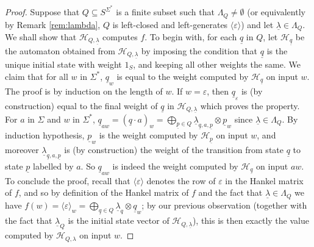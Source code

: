 \documentclass[10pt,a4paper]{amsart}
\theoremstyle{definition}
\numberwithin{equation}{section}
\numberwithin{theorem}{section}
\begin{document}
\begin{proof}
Suppose that $Q \subseteq S^{\Sigma^*}$ is a finite subset such that $\Lambda_Q \neq \emptyset$ (or equivalently by Remark \ref{rem:lambda}, $Q$ is left-closed and left-generates $\langle \varepsilon \rangle$) and let $\underline{\lambda} \in \Lambda_{Q}$. We shall show that $\mathcal{H}_{Q, \underline{\lambda}}$ computes $f$. To begin with, for each $\underline{q}$ in $Q$, let $\mathcal{H}_{\underline{q}}$ be the automaton obtained from $\mathcal{H}_{Q,\underline{\lambda}}$ by imposing the condition that $\underline{q}$ is the unique initial state with weight $1_S$, and keeping all other weights the same. We claim that for all
$w$ in $\Sigma^*$, $\underline{q}_w$ is equal to the weight computed by $\mathcal{H}_{\underline{q}}$ on input $w$. The proof is by induction on the length of $w$. If $w=\varepsilon$, then $\underline{q}_\varepsilon$ is (by construction) equal to the final weight of $\underline{q}$ in $\mathcal{H}_{Q,\underline{\lambda}}$ which proves the property. For $a$ in $\Sigma$ and $w$ in $\Sigma^*$, $\underline{q}_{aw} = (\underline{q}\cdot a)_w = \bigoplus_{\underline{p} \in Q}  \underline{\lambda}_{\underline{q},a,\underline{p}} \otimes \underline{p}_w$ since $\underline{\lambda} \in \Lambda_Q$. By induction hypothesis, $\underline{p}_w$ is the weight computed by $\mathcal{H}_{\underline{p}}$ on input $w$, and moreover $\underline{\lambda}_{\underline{q},a,\underline{p}}$ is (by construction)  the weight of the transition from state $\underline{q}$ to state $\underline{p}$ labelled by $a$. So $\underline{q}_{aw}$ is indeed the weight computed by $\mathcal{H}_{\underline{q}}$ on input $aw$. To conclude the proof, recall that $\langle \varepsilon \rangle$ denotes the row of $\varepsilon$ in the Hankel matrix of $f$, and so by definition of the Hankel matrix of $f$ and the fact that $\underline{\lambda} \in \Lambda_Q$ we have $f(w) = \langle \varepsilon \rangle_w = \bigoplus_{\underline{q} \in Q} \underline{\lambda}_q \otimes \underline{q}_w$; by our previous observation (together with the fact that $\underline{\lambda}_Q$ is the initial state vector of $\mathcal{H}_{Q, \underline{\lambda}}$), this is then exactly the value computed by $\mathcal{H}_{Q, \lambda}$ on input $w$.
	

\end{proof}
\end{document}

